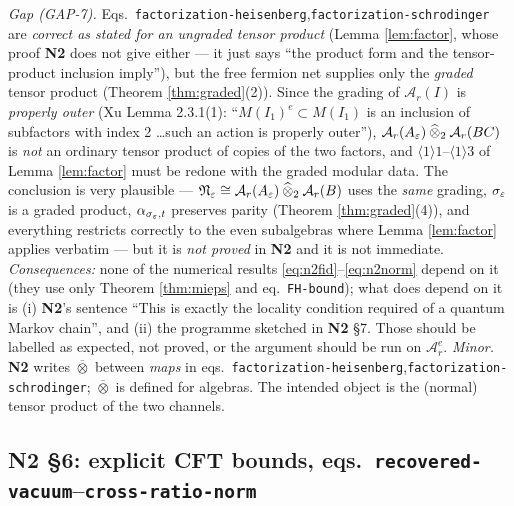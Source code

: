 \documentclass[11pt]{article}
\newcommand{\Ar}{\mathcal A_r}
\newcommand{\NII}{\textbf{N2}}
\newcommand{\loc}[1]{{\small\texttt{#1}}}
\newcommand{\gt}{\mathbin{\widehat\otimes}_2}
\newcommand{\1}{\mathbf 1}
\begin{document}
\begin{verdictgap}
\emph{Gap (GAP-7).} Eqs.~\loc{factorization-heisenberg},\loc{factorization-schrodinger} are
\emph{correct as stated for an ungraded tensor product} (Lemma \ref{lem:factor}, whose proof \NII{}
does not give either --- it just says ``the product form and the tensor-product inclusion imply''),
but the free fermion net supplies only the \emph{graded} tensor product
(Theorem \ref{thm:graded}(2)). Since the grading of $\Ar(I)$ is \emph{properly outer}
(Xu Lemma 2.3.1(1): ``$M(I_1)^e\subset M(I_1)$ is an inclusion of subfactors with index 2 \dots such an
action is properly outer''), $\Ar(A_\eps)\gt\Ar(BC)$ is \emph{not} an ordinary tensor product of
copies of the two factors, and $\langle1\rangle1$--$\langle1\rangle3$ of Lemma \ref{lem:factor} must be
redone with the graded modular data. The conclusion is very plausible ---
$\cN_\eps\cong\Ar(A_\eps)\gt\Ar(B)$ uses the \emph{same} grading, $\sigma_\varepsilon$ is a graded product,
$\alpha_{\sigma_\varepsilon,t}$ preserves parity (Theorem \ref{thm:graded}(4)), and everything restricts
correctly to the even subalgebras where Lemma \ref{lem:factor} applies verbatim --- but it is
\emph{not proved} in \NII{} and it is not immediate.
\emph{Consequences:} none of the numerical results \eqref{eq:n2fid}--\eqref{eq:n2norm} depend on it
(they use only Theorem \ref{thm:mieps} and eq.~\loc{FH-bound}); what does depend on it is
(i) \NII's sentence ``This is exactly the locality condition required of a quantum Markov chain'', and
(ii) the programme sketched in \NII{} \S7. Those should be labelled as expected, not proved, or the
argument should be run on $\Ar^e$.
\emph{Minor.} \NII{} writes $\overline\otimes$ between \emph{maps} in
eqs.~\loc{factorization-heisenberg},\loc{factorization-schrodinger}; $\overline\otimes$ is defined for
algebras. The intended object is the (normal) tensor product of the two channels.
\end{verdictgap}

\subsection{N2 \S6: explicit CFT bounds, eqs.\ \loc{recovered-vacuum}--\loc{cross-ratio-norm}}
\end{document}
